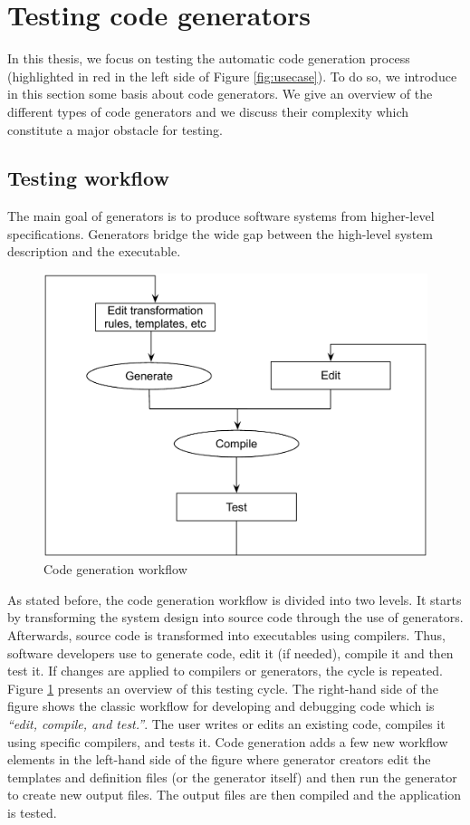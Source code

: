 \section{Testing code generators}
\label{bg:Testing code generators}
In this thesis, we focus on testing the automatic code generation process (highlighted in red in the left side of Figure \ref{fig:usecase}). To do so, we introduce in this section some basis about code generators. We give an overview of the different types of code generators and we discuss their complexity which constitute a major obstacle for testing.
\subsection{Testing workflow}
The main goal of generators is to produce software systems from higher-level specifications. Generators bridge the wide gap between the high-level system description and the executable.
\begin{figure}[h]
	\center
	\includegraphics[scale=0.7]{Background/fig/workflow}
	\caption{Code generation workflow}
	\label{fig:workflow}
\end{figure}

As stated before, the code generation workflow is divided into two levels. It starts by transforming the system design into source code through the use of generators. Afterwards, source code is transformed into executables using compilers. Thus, software developers use to generate code, edit it (if needed), compile it and then test it. If changes are applied to compilers or generators, the cycle is repeated. Figure \ref{fig:workflow} presents an overview of this testing cycle. The right-hand side of the figure shows the classic workflow for developing and debugging code which is \textit{“edit, compile, and test.”}. The user writes or edits an existing code, compiles it using specific compilers, and tests it. Code generation adds a few new workflow elements in the left-hand side of the figure where generator creators edit the templates and definition files (or the generator itself) and then run the generator to create new output files. The output files are then compiled and the application is tested. 



